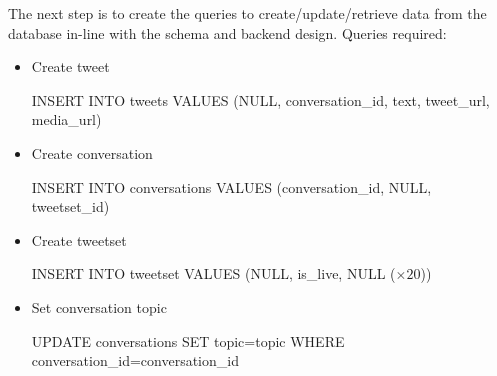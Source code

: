 The next step is to create the queries to create/update/retrieve data from the database in-line with the schema and backend design. Queries required:
\begin{itemize}
    \item Create tweet
    \begin{algorithm}
        \begin{algorithmic}
            \STATE INSERT INTO tweets VALUES (NULL, conversation\_id, text, tweet\_url, media\_url)
        \end{algorithmic}
    \end{algorithm}
\end{itemize}

\begin{itemize}
    \item Create conversation
    \begin{algorithm}
        \begin{algorithmic}
            \STATE INSERT INTO conversations VALUES (conversation\_id, NULL, tweetset\_id)
        \end{algorithmic}
    \end{algorithm}
\end{itemize}
\newpage
\begin{itemize}
    \item Create tweetset
    \begin{algorithm}
        \begin{algorithmic}
            \STATE INSERT INTO tweetset VALUES (NULL, is\_live, NULL ($\times 20$))
        \end{algorithmic}
    \end{algorithm}
\end{itemize}

\begin{itemize}
    \item Set conversation topic
    \begin{algorithm}
        \begin{algorithmic}
            \STATE UPDATE conversations SET topic=topic WHERE conversation\_id=conversation\_id
        \end{algorithmic}
    \end{algorithm}
\end{itemize}

